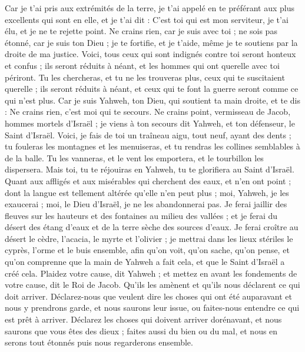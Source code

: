 \begin{multicols}{2}
Car je t'ai pris aux extrémités de la terre, je t'ai appelé en te préférant aux plus excellents qui sont en elle, et je t'ai dit : C'est toi qui est mon serviteur, je t'ai élu, et je ne te rejette point.
Ne crains rien, car je suis avec toi ; ne sois pas étonné, car je suis ton Dieu ; je te fortifie, et je t'aide, même je te soutiens par la droite de ma justice.
Voici, tous ceux qui sont indignés contre toi seront honteux et confus ; ils seront réduits à néant, et les hommes qui ont querelle avec toi périront.
Tu les chercheras, et tu ne les trouveras plus, ceux qui te suscitaient querelle ; ils seront réduits à néant, et ceux qui te font la guerre seront comme ce qui n'est plus.
Car je suis Yahweh, ton Dieu, qui soutient ta main droite, et te dis : Ne crains rien, c'est moi qui te secours.
Ne crains point, vermisseau de Jacob, hommes mortels d'Israël ; je viens à ton secours dit Yahweh, et ton défenseur, le Saint d'Israël.
Voici, je fais de toi un traîneau aigu, tout neuf, ayant des dents ; tu fouleras les montagnes et les menuiseras, et tu rendras les collines semblables à de la balle.
Tu les vanneras, et le vent les emportera, et le tourbillon les dispersera. Mais toi, tu te réjouiras en Yahweh, tu te glorifiera au Saint d'Israël.
Quant aux affligés et aux misérables qui cherchent des eaux, et n'en ont point ; dont la langue est tellement altérée qu'elle n'en peut plus ; moi, Yahweh, je les exaucerai ; moi, le Dieu d'Israël, je ne les abandonnerai pas.
Je ferai jaillir des fleuves sur les hauteurs et des fontaines au milieu des vallées ; et je ferai du désert des étang d'eaux et de la terre sèche des sources d'eaux.
Je ferai croître au désert le cèdre, l'acacia, le myrte et l'olivier ; je mettrai dans les lieux stériles le cyprès, l'orme et le buis ensemble,
afin qu'on voit, qu'on sache, qu'on pense, et qu'on comprenne que la main de Yahweh a fait cela, et que le Saint d'Israël a créé cela.
Plaidez votre cause, dit Yahweh ; et mettez en avant les fondements de votre cause, dit le Roi de Jacob.
Qu'ils les amènent et qu'ils nous déclarent ce qui doit arriver. Déclarez-nous que veulent dire les choses qui ont été auparavant et nous y prendrons garde, et nous saurons leur issue, ou faites-nous entendre ce qui est prêt à arriver. 
Déclarez les choses qui doivent arriver dorénavant, et nous saurons que vous êtes des dieux ; faites aussi du bien ou du mal, et nous en serons tout étonnés puis nous regarderons ensemble.

\end{multicols}
